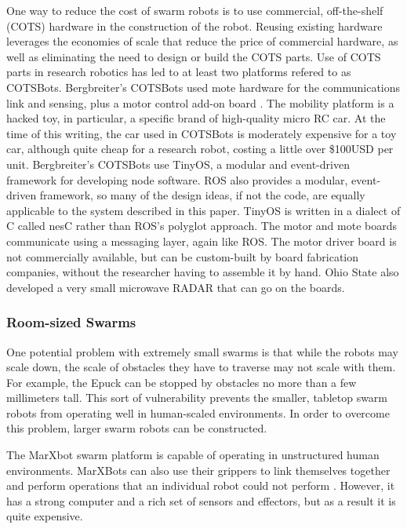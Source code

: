 \documentclass[]{article}
\begin{document}
One way to reduce the cost of swarm robots is to use commercial, off-the-shelf (COTS) hardware in the construction of the robot. 
Reusing existing hardware leverages the economies of scale that reduce the price of commercial hardware, as well as eliminating the need to design or build the COTS parts. 
Use of COTS parts in research robotics has led to at least two platforms refered to as COTSBots.
Bergbreiter's COTSBots used mote hardware for the communications link and sensing, plus a motor control add-on board \cite{bergbreiter2003cotsbots}. 
The mobility platform is a hacked toy, in particular, a specific brand of high-quality micro RC car.
At the time of this writing, the car used in COTSBots is moderately expensive for a toy car, although quite cheap for a research robot, costing a little over \$100USD per unit. 
Bergbreiter's COTSBots use TinyOS, a modular and event-driven framework  for developing node software. 
ROS also provides a modular, event-driven framework, so many of the design ideas, if not the code, are equally applicable to the system described in this paper. 
TinyOS is written in a dialect of C called nesC rather than ROS's polyglot approach. The motor and mote boards communicate using a messaging layer, again like ROS. 
The motor driver board is not commercially available, but can be custom-built by board fabrication companies, without the researcher having to assemble it by hand. 
Ohio State also developed a very small microwave RADAR that can go on the boards.

\subsubsection{Room-sized Swarms}

One potential problem with extremely small swarms is that while the robots may scale down, the scale of obstacles they have to traverse may not scale with them. 
For example, the Epuck can be stopped by obstacles no more than a few millimeters tall. 
This sort of vulnerability prevents the smaller, tabletop swarm robots from operating well in human-scaled environments. 
In order to overcome this problem, larger swarm robots can be constructed.
 
The MarXbot swarm platform  is capable of operating in unstructured human environments. MarXBots can also use their grippers to link themselves together and perform operations  that an individual robot could not perform \cite{bonani2010marxbot}. However, it has a strong computer and a rich set of sensors and effectors, but as a result it is quite expensive. 
\end{document}
